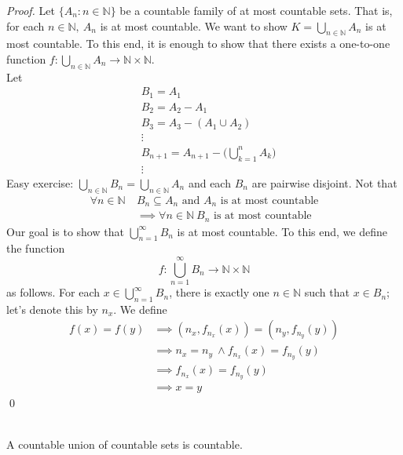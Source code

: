 \begin{proof}
    Let $\{A_n : n\in \mathbb{N}\}$ be a countable family of at most countable sets. That is, for each $n\in \mathbb{N}, ~A_n$ is at most countable. We want to show $K=\bigcup \limits_{n\in \mathbb{N}} A_n$ is at most countable. To this end, it is enough to show that there exists a one-to-one function $f: \bigcup \limits_{n\in \mathbb{N}}A_n \rightarrow \mathbb{N} \times \mathbb{N}$. \\
	Let
    \begin{align*}
        &B_1=A_1 \\
        &B_2=A_2 -A_1 \\
        &B_3=A_3-(A_1\cup A_2) \\
        &\vdots \\
        &B_{n+1}=A_{n+1} - \big( \bigcup \limits_{k=1}^n A_k\big) \\
        &\vdots
    \end{align*}
    Easy exercise: $\bigcup \limits_{n\in \mathbb{N}} B_n = \bigcup \limits_{n\in \mathbb{N}} A_n$ and each $B_n$ are pairwise disjoint.
	Not that
    \begin{align*}
        \forall n\in \mathbb{N} ~&B_n \subseteq A_n \text{ and } A_n \text{ is at most countable} \\
        &\implies \forall n \in \mathbb{N} ~B_n \text{ is at most countable}
    \end{align*}
    Our goal is to show that $\bigcup \limits_{n=1}^\infty B_n$ is at most countable. To this end, we define the function
    $$f: \bigcup \limits_{n=1}^{\infty}B_n \rightarrow \mathbb{N} \times \mathbb{N}$$
    as follows.
	For each $x \in \bigcup \limits_{n=1}^{\infty} B_n$,  there is exactly one $n\in \mathbb{N}$ such that $x\in B_n$; let’s denote this by $n_x$. We define
    \begin{align*}
        f(x)=f(y) &\implies(n_x, f_{n_x}(x)) = (n_y, f_{n_y}(y)) \\
        &\implies n_x=n_y ~\wedge f_{n_x}(x) = f_{n_y}(y) \\
        &\implies f_{n_x}(x) = f_{n_y}(y) \\
        &\implies x=y
    \end{align*}
    \qed
\end{proof}

\begin{corollary} \leavevmode \\
    \label{corB1}
    A countable union of countable sets is countable.
\end{corollary}

